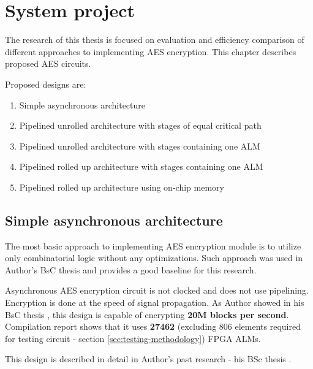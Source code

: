 \section{System project}
\label{sec:system-project}
The research of this thesis is focused on evaluation and efficiency comparison of different approaches to implementing AES encryption. This chapter describes proposed AES circuits.

Proposed designs are:
\begin{enumerate}[noitemsep]
\item Simple asynchronous architecture
\item Pipelined unrolled architecture with stages of equal critical path
\item Pipelined unrolled architecture with stages containing one ALM
\item Pipelined rolled up architecture with stages containing one ALM
\item Pipelined rolled up architecture using on-chip memory
\end{enumerate}

\subsection{Simple asynchronous architecture}
The most basic approach to implementing AES encryption module is to utilize only combinatorial logic without any optimizations. Such approach was used in Author's BsC thesis \cite{inzynierka} and provides a good baseline for this research.

Asynchronous AES encryption circuit is not clocked and does not use pipelining. Encryption is done at the speed of signal propagation. As Author showed in his BsC thesis \cite{inzynierka}, this design is capable of encrypting \textbf{20M blocks per second}. Compilation report shows that it uses \textbf{27462} (excluding 806 elements required for testing circuit - section \ref{sec:testing-methodology}) FPGA ALMs.

This design is described in detail in Author's past research - his BSc thesis \cite{inzynierka}.



